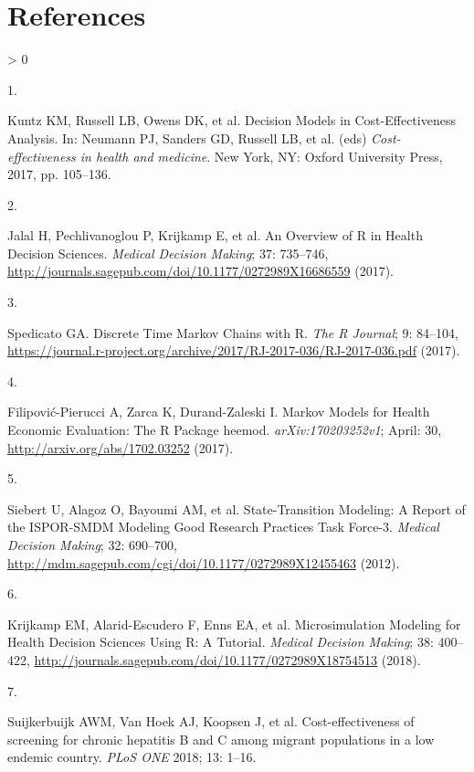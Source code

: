 \documentclass[
]{article}
\newlength{\cslhangindent}
\newlength{\csllabelwidth}
\newenvironment{CSLReferences}[2] %
 {%
  \setlength{\parindent}{0pt}
  \ifodd #1 \everypar{\setlength{\hangindent}{\cslhangindent}}\ignorespaces\fi
  \ifnum #2 > 0
  \setlength{\parskip}{#2\baselineskip}
  \fi
 }%
 {}
\newcommand{\CSLLeftMargin}[1]{\parbox[t]{\csllabelwidth}{#1}}
\newcommand{\CSLRightInline}[1]{\parbox[t]{\linewidth - \csllabelwidth}{#1}\break}
\begin{document}
\hypertarget{references}{%
\section*{References}\label{references}}

\hypertarget{refs}{}
\begin{CSLReferences}{0}{0}
\leavevmode\hypertarget{ref-Kuntz2017}{}%
\CSLLeftMargin{1. }
\CSLRightInline{Kuntz KM, Russell LB, Owens DK, et al. {Decision Models in Cost-Effectiveness Analysis}. In: Neumann PJ, Sanders GD, Russell LB, et al. (eds) \emph{Cost-effectiveness in health and medicine}. New York, NY: Oxford University Press, 2017, pp. 105--136.}

\leavevmode\hypertarget{ref-Jalal2017b}{}%
\CSLLeftMargin{2. }
\CSLRightInline{Jalal H, Pechlivanoglou P, Krijkamp E, et al. {An Overview of R in Health Decision Sciences}. \emph{Medical Decision Making}; 37: 735--746, \url{http://journals.sagepub.com/doi/10.1177/0272989X16686559} (2017).}

\leavevmode\hypertarget{ref-Spedicato2017}{}%
\CSLLeftMargin{3. }
\CSLRightInline{Spedicato GA. {Discrete Time Markov Chains with R}. \emph{The R Journal}; 9: 84--104, \url{https://journal.r-project.org/archive/2017/RJ-2017-036/RJ-2017-036.pdf} (2017).}

\leavevmode\hypertarget{ref-Filipovic-Pierucci2017}{}%
\CSLLeftMargin{4. }
\CSLRightInline{Filipović-Pierucci A, Zarca K, Durand-Zaleski I. {Markov Models for Health Economic Evaluation: The R Package heemod}. \emph{arXiv:170203252v1}; April: 30, \url{http://arxiv.org/abs/1702.03252} (2017).}

\leavevmode\hypertarget{ref-Siebert2012c}{}%
\CSLLeftMargin{5. }
\CSLRightInline{Siebert U, Alagoz O, Bayoumi AM, et al. {State-Transition Modeling: A Report of the ISPOR-SMDM Modeling Good Research Practices Task Force-3}. \emph{Medical Decision Making}; 32: 690--700, \url{http://mdm.sagepub.com/cgi/doi/10.1177/0272989X12455463} (2012).}

\leavevmode\hypertarget{ref-Krijkamp2018}{}%
\CSLLeftMargin{6. }
\CSLRightInline{Krijkamp EM, Alarid-Escudero F, Enns EA, et al. {Microsimulation Modeling for Health Decision Sciences Using R: A Tutorial}. \emph{Medical Decision Making}; 38: 400--422, \url{http://journals.sagepub.com/doi/10.1177/0272989X18754513} (2018).}

\leavevmode\hypertarget{ref-Suijkerbuijk2018}{}%
\CSLLeftMargin{7. }
\CSLRightInline{Suijkerbuijk AWM, Van Hoek AJ, Koopsen J, et al. {Cost-effectiveness of screening for chronic hepatitis B and C among migrant populations in a low endemic country}. \emph{PLoS ONE} 2018; 13: 1--16.}


\end{CSLReferences}
\end{document}
